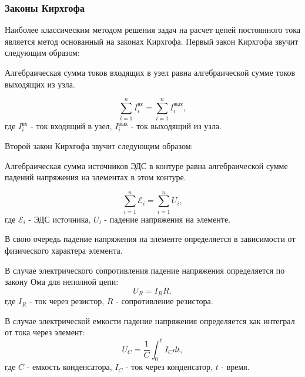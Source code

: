 \subsubsection{Законы Кирхгофа}
Наиболее классическим методом решения задач на расчет цепей постоянного тока является метод основанный на законах Кирхгофа.
Первый закон Кирхгофа звучит следующим образом:

\begin{tcolorbox}[
    colback=white,
    colframe=gray!60!black,
    title=Первый закон Кирхгофа,
    fonttitle=\bfseries,
    arc=3pt,
    boxrule=1pt
]
Алгебраическая сумма токов входящих в узел равна алгебраической сумме токов выходящих из узла.
\end{tcolorbox}
\begin{equation}
    \sum_{i=1}^{n} I_i^{\text{вх}} = \sum_{i=1}^{n} I_i^{\text{вых}},
    \label{eq:kirchhoff_laws_1}
\end{equation}
где $I_i^{\text{вх}}$ - ток входящий в узел, $I_i^{\text{вых}}$ - ток выходящий из узла.

Второй закон Кирхгофа звучит следующим образом:

\begin{tcolorbox}[
    colback=white,
    colframe=gray!60!black,
    title=Второй закон Кирхгофа,
    fonttitle=\bfseries,
    arc=3pt,
    boxrule=1pt
]
Алгебраическая сумма источников ЭДС в контуре равна алгебраической сумме падений напряжения на элементах в этом контуре.
\end{tcolorbox}


\begin{equation}
    \sum_{i=1}^{n} \mathcal{E}_i = \sum_{i=1}^{n} U_i,
    \label{eq:kirchhoff_laws_2}
\end{equation}
где $\mathcal{E}_i$ - ЭДС источника, $U_i$ - падение напряжения на элементе.

В свою очередь падение напряжения на элементе определяется в зависимости от физического характера элемента.

В случае электрического сопротивления падение напряжения определяется по закону Ома для неполной цепи:
\begin{equation}
    U_R = I_R R,
    \label{eq:kirchhoff_laws_2_1}
\end{equation}
где $I_R$ - ток через резистор, $R$ - сопротивление резистора.

В случае электрической емкости падение напряжения определяется как интеграл от тока через элемент:
\begin{equation}
    U_C = \frac{1}{C} \int_{0}^{t} I_C dt,
    \label{eq:kirchhoff_laws_2_2}
\end{equation}
где $C$ - емкость конденсатора, $I_C$ - ток через конденсатор, $t$ - время.

